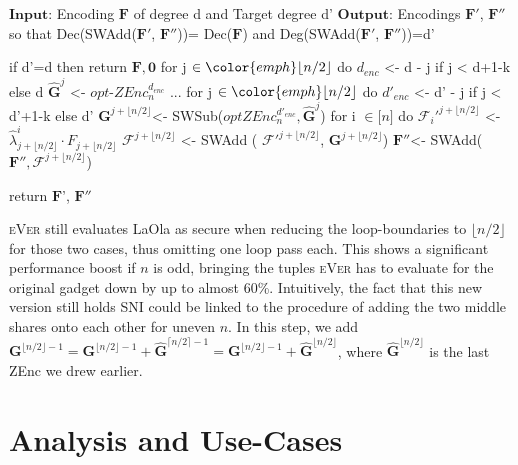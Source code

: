 \documentclass[english, version-2020-11]{uzl-thesis}
\newcommand{\toolname}[1]{\textsc{#1}}
\begin{document}
 \begin{Pseudocode}[caption={Improved SplitRed for $n=d+e+1$ and $k\leq \lfloor \frac{d}{2} \rfloor$. Changes to the original versn are marked in \color{emph} red. }, label = {alg:improvedsplitred}]
    $\mathbf{Input}$: Encoding $\mathbf{F}$ of degree d and Target degree d'
  $\mathbf{Output}$: Encodings $\mathbf{F'}$, $\mathbf{F''}$ so that Dec(SWAdd($\mathbf{F'}$, $\mathbf{F''}$))= Dec($\mathbf{F}$) 
    and Deg(SWAdd($\mathbf{F'}$, $\mathbf{F''}$))=d'

    if d'=d then 
      return $\mathbf{F},\mathbf{0}$
    for j $\in \color{emph}\lfloor n/2 \rfloor$ do
      $ d_{enc}$ <- d - j if j < d+1-k else d
      $\hat{\mathbf{G}}^j$ <- $opt\mbox{-}ZEnc^{d_{enc}}_n$
    ...
    for j $\in \color{emph}\lfloor n/2 \rfloor$ do
      $ d'_{enc}$ <- d' - j if j < d'+1-k else d'
      $\mathbf{G}^{j+\lfloor n/2 \rfloor}$<- SWSub($optZEnc_n^{d'_{enc}}, \hat{\mathbf{G}}^j$)
      for i $\in \lbrack n \rbrack$ do 
        $\mathcal{F}_i'^{j+\lfloor n/2 \rfloor}$ <- $\hat{\lambda}^i_{j+ \lfloor n/2 \rfloor} \cdot F_{j+ \lfloor n/2 \rfloor}$
      $\mathcal{F}^{j+\lfloor n/2 \rfloor}$ <- SWAdd ( $\mathcal{F}'^{j+\lfloor n/2 \rfloor}$, $\mathbf{G}^{j+\lfloor n/2 \rfloor}$)
      $\mathbf{F}'' $<- SWAdd($\mathbf{F}'', \mathcal{F}^{j+\lfloor n/2 \rfloor}$)
    
    return $\mathbf{F}$', $\mathbf{F}''$

    \end{Pseudocode}


    \toolname{eVer} still evaluates LaOla as secure when reducing the loop-boundaries to $\lfloor n/2 \rfloor$ for those two cases, thus omitting one loop pass each. This shows a significant performance boost if $n$ is odd, bringing the tuples \toolname{eVer} has to evaluate for the original gadget down by up to almost 60\%. Intuitively, the fact that this new version still holds SNI could be linked to the procedure of adding the two middle shares onto each other for uneven $n$. In this step, we add $\mathbf{G}^{\lfloor n/2\rfloor -1}=\mathbf{G}^{\lfloor n/2\rfloor -1}+\hat{\mathbf{G}}^{\lceil n/2\rceil -1}=\mathbf{G}^{\lfloor n/2\rfloor -1}+\hat{\mathbf{G}}^{\lfloor n/2\rfloor}$, where $\hat{\mathbf{G}}^{\lfloor n/2\rfloor}$ is the last ZEnc we drew earlier.


  \chapter{Analysis and Use-Cases}
\end{document}

